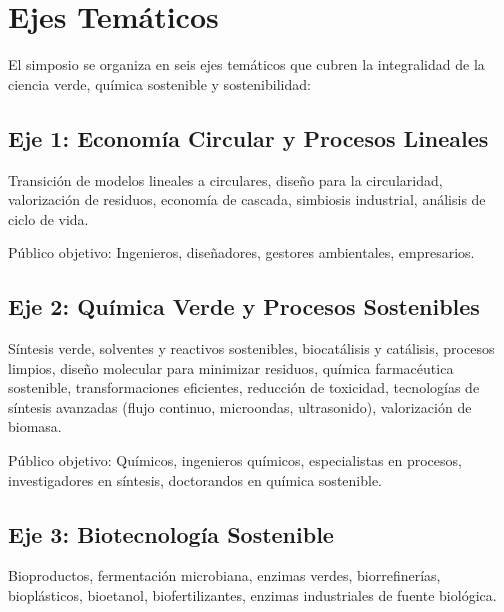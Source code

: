 \documentclass[12pt,a4paper]{article}
\begin{document}
\section{Ejes Temáticos}

El simposio se organiza en seis ejes temáticos que cubren la integralidad de la ciencia verde, química sostenible y sostenibilidad:

\subsection{Eje 1: Economía Circular y Procesos Lineales}

\begin{tcolorbox}[cajainfo, title=Tópicos principales]
Transición de modelos lineales a circulares, diseño para la circularidad, valorización de residuos, economía de cascada, simbiosis industrial, análisis de ciclo de vida.
\end{tcolorbox}

Público objetivo: Ingenieros, diseñadores, gestores ambientales, empresarios.

\subsection{Eje 2: Química Verde y Procesos Sostenibles}

\begin{tcolorbox}[cajainfo, title=Tópicos principales]
Síntesis verde, solventes y reactivos sostenibles, biocatálisis y catálisis, procesos limpios, diseño molecular para minimizar residuos, química farmacéutica sostenible, transformaciones eficientes, reducción de toxicidad, tecnologías de síntesis avanzadas (flujo continuo, microondas, ultrasonido), valorización de biomasa.
\end{tcolorbox}

Público objetivo: Químicos, ingenieros químicos, especialistas en procesos, investigadores en síntesis, doctorandos en química sostenible.

\subsection{Eje 3: Biotecnología Sostenible}

\begin{tcolorbox}[cajainfo, title=Tópicos principales]
Bioproductos, fermentación microbiana, enzimas verdes, biorrefinerías, bioplásticos, bioetanol, biofertilizantes, enzimas industriales de fuente biológica.
\end{tcolorbox}
\end{document}
